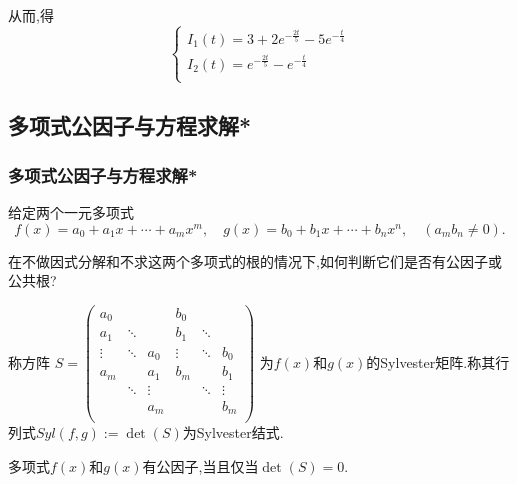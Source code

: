 \begin{frame}
    从而,得
    \begin{equation*}
    \left\{
    \begin{array}{l}
    I_1(t) = 3 +2e^{-\frac{2t}{5}} - 5e^{-\frac{t}{4}}\\
    I_2(t) = e^{-\frac{2t}{5}} - e^{-\frac{t}{4}}\\
    \end{array}
    \right.
    \end{equation*}
    \end{frame}





    \subsection{多项式公因子与方程求解*}
\begin{frame}\frametitle{多项式公因子与方程求解*}
    给定两个一元多项式
    \[f(x)=a_0+a_1x+\cdots+a_mx^m,\quad g(x)=b_0+b_1x+\cdots+b_nx^n,\quad (a_mb_n\neq0).\]
    \begin{question}
    在不做因式分解和不求这两个多项式的根的情况下,如何判断它们是否有公因子或公共根?
    \end{question}
    称方阵 $S=\begin{pmatrix}
    a_0 &&& b_0&&\\
    a_1 &\ddots&& b_1&\ddots&\\
    \vdots &\ddots&a_0& \vdots&\ddots&b_0\\
    a_m &&a_1& b_m&&b_1\\
     &\ddots&\vdots&&\ddots& \vdots\\
    &&a_m&&&b_m\\
    \end{pmatrix} $
    为$f(x)$和$g(x)$的Sylvester矩阵.称其行列式$Syl(f,g):=\det(S)$为Sylvester结式.
    \begin{theorem}
    多项式$f(x)$和$g(x)$有公因子,当且仅当$\det(S)=0$.
    \end{theorem}
    \end{frame}







